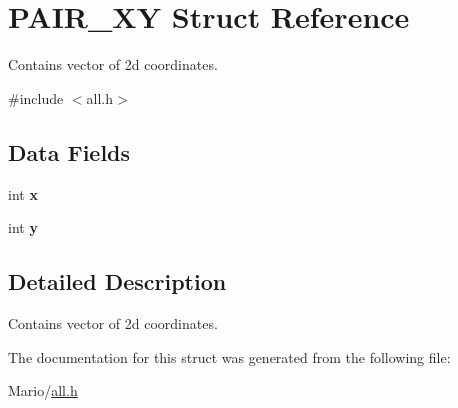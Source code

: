 \hypertarget{struct_p_a_i_r___x_y}{}\section{P\+A\+I\+R\+\_\+\+XY Struct Reference}
\label{struct_p_a_i_r___x_y}


Contains vector of 2d coordinates.  




{\ttfamily \#include $<$all.\+h$>$}

\subsection*{Data Fields}
\begin{DoxyCompactItemize}
\item 
\mbox{\label{struct_p_a_i_r___x_y_a6150e0515f7202e2fb518f7206ed97dc}} 
int {\bfseries x}
\item 
\mbox{\label{struct_p_a_i_r___x_y_a0a2f84ed7838f07779ae24c5a9086d33}} 
int {\bfseries y}
\end{DoxyCompactItemize}


\subsection{Detailed Description}
Contains vector of 2d coordinates. 

The documentation for this struct was generated from the following file\+:\begin{DoxyCompactItemize}
\item 
Mario/\mbox{\hyperlink{all_8h}{all.\+h}}\end{DoxyCompactItemize}
